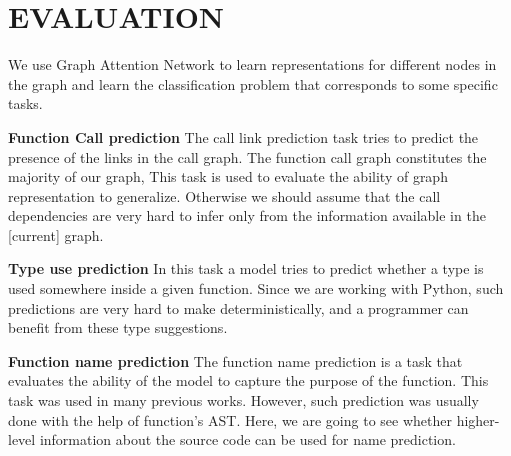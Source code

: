 \documentclass[a4paper,twoside]{article}
\begin{document}
\section{\uppercase{Evaluation}}

We use Graph Attention Network to learn representations for different nodes in the graph and learn the classification problem that corresponds to some specific tasks. 


\textbf{Function Call prediction}
The call link prediction task tries to predict the presence of the links in the call graph. The function call graph constitutes the majority of our graph, This task is used to evaluate the ability of graph representation to generalize. Otherwise we should assume that the call dependencies are very hard to infer only from the information available in the [current] graph. 

\textbf{Type use prediction}
In this task a model tries to predict whether a type is used somewhere inside a given function. Since we are working with Python, such predictions are very hard to make deterministically, and a programmer can benefit from these type suggestions. 

\textbf{Function name prediction}
The function name prediction is a task that evaluates the ability of the model to capture the purpose of the function. This task was used in many previous works. However, such prediction was usually done with the help of function's AST. Here, we are going to see whether higher-level information about the source code can be used for name prediction. 
\end{document}
